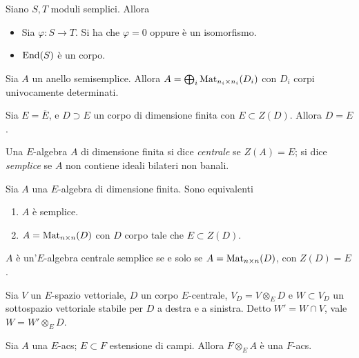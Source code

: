 \begin{lemma}[Schur]
    Siano $S,T$ moduli semplici. Allora
    \begin{itemize}
        \item Sia $\varphi:S\to T$. Si ha che $\varphi=0$ oppure è un isomorfismo.
        \item $\operatorname{End}(S)$ è un corpo.
    \end{itemize}
\end{lemma}

\begin{theorem}[Wedderburn]
    Sia $A$ un anello semisemplice. Allora $A=\bigoplus_i \operatorname{Mat}_{n_i\times n_i}(D_i)$ con $D_i$ corpi univocamente determinati.
\end{theorem}

\begin{proposition}
    Sia $E=\overline{E}$, e $D\supset E$ un corpo di dimensione finita con $E\subset Z(D)$. Allora $D=E$.
\end{proposition}

\begin{definition}
    Una $E$-algebra $A$ di dimensione finita si dice \emph{centrale} se $Z(A)=E$; si dice \emph{semplice} se $A$ non contiene ideali bilateri non banali.
\end{definition}

\begin{proposition}
    Sia $A$ una $E$-algebra di dimensione finita. Sono equivalenti
    \begin{enumerate}
        \item $A$ è semplice.
        \item $A=\operatorname{Mat}_{n\times n}(D)$ con $D$ corpo tale che $E\subset Z(D)$.
    \end{enumerate}
\end{proposition}

\begin{corollary}
    $A$ è un'$E$-algebra centrale semplice se e solo se $A=\operatorname{Mat}_{n\times n}(D)$, con $Z(D)=E$.
\end{corollary}


\begin{lemma}
    Sia $V$ un $E$-spazio vettoriale, $D$ un corpo $E$-centrale, $V_D=V\otimes_E D$ e $W\subset V_D$ un sottospazio vettoriale stabile per $D$ a destra e a sinistra. Detto $W'=W\cap V$, vale $W=W'\otimes_ED$.
\end{lemma}

\begin{theorem}
    Sia $A$ una $E$-acs; $E\subset F$ estensione di campi. Allora $F\otimes_E A$ è una $F$-acs.
\end{theorem}

